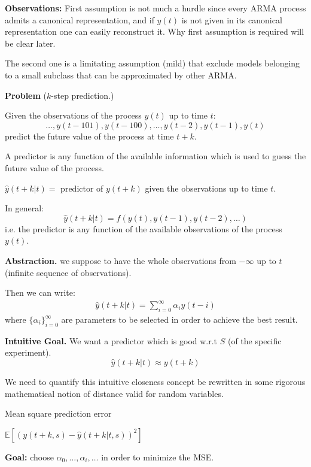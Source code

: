 \textbf{Observations:}
First assumption is not much a hurdle since every ARMA process admits a canonical representation, and if $y(t)$ is not given in its canonical representation one can easily reconstruct it. Why first assumption is required will be clear later. 

The second one is a limitating assumption (mild) that exclude models belonging to a small subclass that can be approximated by other ARMA.

\textbf{Problem} ($k$-step prediction.)

Given the observations of the process $y(t)$ up to time $t$:
$$
	\ldots , y(t-101), y(t-100), \ldots , y(t-2), y(t-1), y(t)
$$
predict the future value of the process at time $t + k$.


A predictor is any function of the available information which is used to guess the future value of the process.

$\hat{y}(t + k | t) =$ predictor of $y(t + k)$ given the observations up to time $t$.

In general: 
$$\hat{y}(t + k | t) = f ( y(t), y(t-1), y(t-2),\ldots)$$
i.e. the predictor is any function of the available observations of the process $y(t)$.

\textbf{Abstraction.} we suppose to have the whole observations from $-\infty$ up to $t$ (infinite sequence of observations).

Then we can write:
\begin{align*}
	\hat{y}(t + k | t)=\sum_{i=0}^{\infty}\alpha_i y(t-i)
\end{align*}
where ${\{\alpha_i\}}_{i=0}^\infty$ are parameters to be selected in order to achieve the best result.

\textbf{Intuitive Goal.} 
We want a predictor which is good w.r.t $S$ (of the specific experiment).
$$\hat{y}(t + k | t)\approx y(t+k) $$

We need to quantify this intuitive closeness concept be rewritten in some rigorous mathematical notion of distance valid for random variables.

\begin{definition}{Mean square prediction error}
	
	$\mathbb{E}[(y(t+k,s)-\hat{y}(t+k|t,s))^2]$
\end{definition}

\textbf{Goal:} choose $\alpha_0,\ldots,\alpha_i,\ldots$ in order to minimize the MSE.